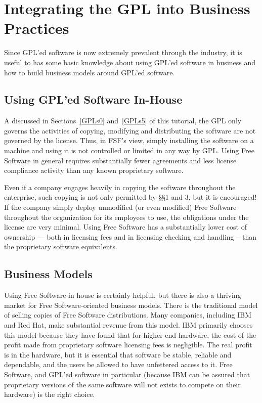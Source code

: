 \documentclass[12pt]{report}
\begin{document}
\chapter{Integrating the GPL into Business Practices}

Since GPL'ed software is now extremely prevalent through the industry, it
is useful to has some basic knowledge about using GPL'ed software in
business and how to build business models around GPL'ed software.

\section{Using GPL'ed Software In-House}

A discussed in Sections~\ref{GPLs0} and~\ref{GPLs5} of this tutorial, the
GPL only governs the activities of copying, modifying and distributing the
software are not governed by the license.  Thus, in FSF's view, simply
installing the software on a machine and using it is not controlled or
limited in any way by GPL\@.  Using Free Software in general requires
substantially fewer agreements and less license compliance activity than
any known proprietary software.

Even if a company engages heavily in copying the software throughout the
enterprise, such copying is not only permitted by \S\S 1 and 3, but it is
encouraged!  If the company simply deploy unmodified (or even modified)
Free Software throughout the organization for its employees to use, the
obligations under the license are very minimal.  Using Free Software has a
substantially lower cost of ownership --- both in licensing fees and in
licensing checking and handling -- than the proprietary software
equivalents.

\section{Business Models}
\label{Business Models}

Using Free Software in house is certainly helpful, but there is also a
thriving market for Free Software-oriented business models.  There is the
traditional model of selling copies of Free Software distributions.  Many
companies, including IBM and Red Hat, make substantial revenue from this
model.  IBM primarily chooses this model because they have found that for
higher-end hardware, the cost of the profit made from proprietary software
licensing fees is negligible.  The real profit is in the hardware, but it is
essential that software be stable, reliable and dependable, and the users
be allowed to have unfettered access to it.  Free Software, and GPL'ed
software in particular (because IBM can be assured that proprietary
versions of the same software will not exists to compete on their
hardware) is the right choice.
\end{document}
